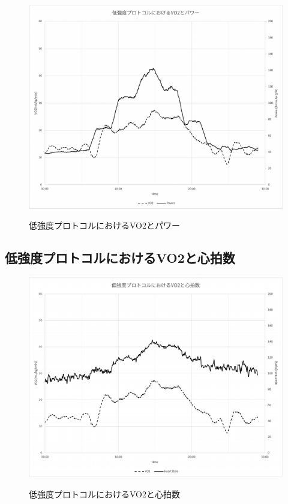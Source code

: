 \begin{figure}[H]
  \begin{center}
    \label{fig:light_vo2_power}
    \includegraphics[width=12cm]{fig/light_vo2_power}
    \caption{低強度プロトコルにおけるVO2とパワー}
  \end{center}
\end{figure}

\subsection{低強度プロトコルにおけるVO2と心拍数}

\begin{figure}[H]
  \begin{center}
    \label{fig:light_vo2_hr}
    \includegraphics[width=12cm]{fig/light_vo2_hr}
    \caption{低強度プロトコルにおけるVO2と心拍数}
  \end{center}
\end{figure}

